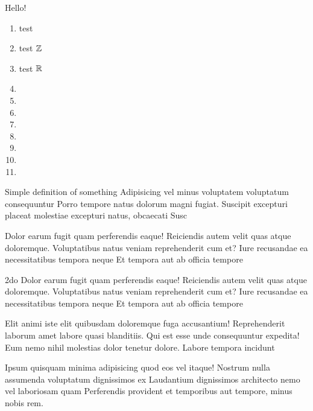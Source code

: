 \documentclass{article}
\begin{document}
    \maketitle[small]
    Hello!
    \begin{enumerate}[label=\listALPHP]
        \item test \nsN{}
        \item test \(\mathbb{Z}{}\)
        \item test \(\mathbb{R}{}\)
        \item {}
        \item {}    
        \item {}
        \item {}
        \item {}  
        \item {} 
        \item {} 
        \item {}
    \end{enumerate}
    \begin{definition}
        Simple definition of something Adipisicing vel minus voluptatem voluptatum consequuntur Porro tempore natus dolorum magni fugiat. Suscipit excepturi placeat molestiae excepturi natus, obcaecati Susc
    \end{definition}
    \begin{theorem}
        Dolor earum fugit quam perferendis eaque! Reiciendis autem velit quas atque doloremque. Voluptatibus natus veniam reprehenderit cum et? Iure recusandae ea necessitatibus tempora neque Et tempora aut ab officia tempore
    \end{theorem}
    \begin{theorem}
        2do Dolor earum fugit quam perferendis eaque! Reiciendis autem velit quas atque doloremque. Voluptatibus natus veniam reprehenderit cum et? Iure recusandae ea necessitatibus tempora neque Et tempora aut ab officia tempore
    \end{theorem}
    \begin{lemma}
        Elit animi iste elit quibusdam doloremque fuga accusantium! Reprehenderit laborum amet labore quasi blanditiis. Qui est esse unde consequuntur expedita! Eum nemo nihil molestias dolor tenetur dolore. Labore tempora incidunt
    \end{lemma}
    \begin{corollary}
        Ipsum quisquam minima adipisicing quod eos vel itaque! Nostrum nulla assumenda voluptatum dignissimos ex Laudantium dignissimos architecto nemo vel laboriosam quam Perferendis provident et temporibus aut tempore, minus nobis rem.
    \end{corollary}
\end{document}
